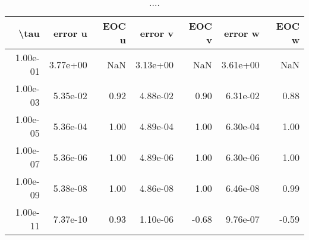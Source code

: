 \begin{table}[ht]
\centering
\begin{tabular}{rrrrrrr}
  \hline
  \textbf{\textbackslash{}tau} & \textbf{error u} & \textbf{EOC u} & \textbf{error v} & \textbf{EOC v} & \textbf{error w} & \textbf{EOC w} \\\hline
  1.00e-01 & 3.77e+00 & NaN & 3.13e+00 & NaN & 3.61e+00 & NaN \\
  1.00e-03 & 5.35e-02 & 0.92 & 4.88e-02 & 0.90 & 6.31e-02 & 0.88 \\
  1.00e-05 & 5.36e-04 & 1.00 & 4.89e-04 & 1.00 & 6.30e-04 & 1.00 \\
  1.00e-07 & 5.36e-06 & 1.00 & 4.89e-06 & 1.00 & 6.30e-06 & 1.00 \\
  1.00e-09 & 5.38e-08 & 1.00 & 4.86e-08 & 1.00 & 6.46e-08 & 0.99 \\
  1.00e-11 & 7.37e-10 & 0.93 & 1.10e-06 & -0.68 & 9.76e-07 & -0.59 \\\hline
\end{tabular}
\caption{....}
\end{table}
